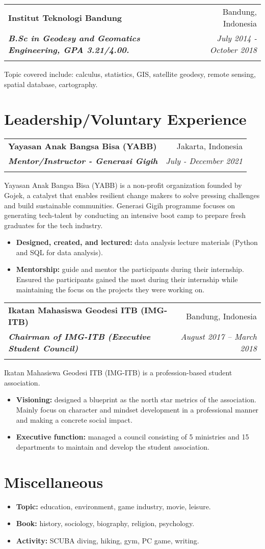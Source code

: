 \documentclass[a4paper, 11pt]{article}
\makeatletter
\newcommand{\resumeItem}[2]{
    \item\small{
        \textbf{#1}{#2 \vspace{-2pt}}
    }
}
\newcommand{\resumeSubheading}[4]{
    \vspace{-1pt}
    \begin{tabular*}{\textwidth}{l@{\extracolsep{\fill}}r}
        \color{lightblue}\textbf{#1} & #2 \\
        \textbf{\textit{\small#3}} & \textit{\small #4} \\
        \textnormal{}\vspace{-5pt}
    \end{tabular*}\vspace{-5pt}
}
\newcommand{\resumeItemListStart}{\begin{itemize}[leftmargin=*]\setlength\itemsep{0em}\vspace{-1pt}}
\newcommand{\resumeItemListEnd}{\end{itemize}\vspace{-5pt}}
\makeatother
\begin{document}
    \vspace{5pt}
    \resumeSubheading
    {Institut Teknologi Bandung}
    {Bandung, Indonesia}
    {B.Sc in Geodesy and Geomatics Engineering, GPA 3.21/4.00.}
    {July 2014 - October 2018}
    {Topic covered include: calculus, statistics, GIS, satellite geodesy, 
    remote sensing, spatial database, cartography.}

    \vspace{-5pt}
    \section{Leadership/Voluntary Experience}

    \resumeSubheading
    {Yayasan Anak Bangsa Bisa (YABB)}
    {Jakarta, Indonesia}
    {Mentor/Instructor - Generasi Gigih}
    {July - December 2021}
    \small{Yayasan Anak Bangsa Bisa (YABB) is a non-profit organization founded by Gojek, a
    catalyst that enables resilient change makers to solve pressing challenges and build
    sustainable communities. Generasi Gigih programme focuses on generating tech-talent
    by conducting an intensive boot camp to prepare fresh graduates for the tech industry.}
    \vspace{-1pt}
    \resumeItemListStart
    \resumeItem{Designed, created, and lectured:}{ data analysis lecture materials (Python and SQL
    for data analysis).}
    \resumeItem{Mentorship:}{ guide and mentor the participants during their internship. Ensured the participants gained the most during their internship while maintaining the focus on the projects they were working on.}
    \resumeItemListEnd

    \vspace{5pt}
    \resumeSubheading
    {Ikatan Mahasiswa Geodesi ITB (IMG-ITB)}
    {Bandung, Indonesia}
    {Chairman of IMG-ITB (Executive Student Council)}
    {August 2017 – March 2018}
    \small{Ikatan Mahasiswa Geodesi ITB (IMG-ITB) is a profession-based student association.}
    \vspace{-1pt}
    \resumeItemListStart
    \resumeItem{Visioning:}{ designed a blueprint as the north star metrics of the
    association. Mainly focus on character and mindset development in a
    professional manner and making a concrete social impact.}
    \resumeItem{Executive function:}{ managed a council consisting of 5 ministries and 15
    departments to maintain and develop the student association.}
    \resumeItemListEnd

    \vspace{-20pt}
    \section{Miscellaneous}

    \resumeItemListStart
    \resumeItem{Topic:}{ education, environment, game industry, movie, leisure.}
    \resumeItem{Book:}{ history, sociology, biography, religion, psychology.}
    \resumeItem{Activity:}{ SCUBA diving, hiking, gym, PC game, writing.}
    \resumeItemListEnd
\end{document}
